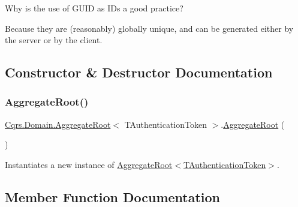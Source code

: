 Why is the use of G\+U\+ID as I\+Ds a good practice?

Because they are (reasonably) globally unique, and can be generated either by the server or by the client. 

\subsection{Constructor \& Destructor Documentation}
\mbox{\label{classCqrs_1_1Domain_1_1AggregateRoot_a1db2322dd7442e1e0c3c07332124eb2f_a1db2322dd7442e1e0c3c07332124eb2f}} 
\subsubsection{\texorpdfstring{Aggregate\+Root()}{AggregateRoot()}}
{\footnotesize\ttfamily \hyperlink{classCqrs_1_1Domain_1_1AggregateRoot}{Cqrs.\+Domain.\+Aggregate\+Root}$<$ T\+Authentication\+Token $>$.\hyperlink{classCqrs_1_1Domain_1_1AggregateRoot}{Aggregate\+Root} (\begin{DoxyParamCaption}{ }\end{DoxyParamCaption})\hspace{0.3cm}{\ttfamily [protected]}}



Instantiates a new instance of \hyperlink{classCqrs_1_1Domain_1_1AggregateRoot_a1db2322dd7442e1e0c3c07332124eb2f_a1db2322dd7442e1e0c3c07332124eb2f}{Aggregate\+Root$<$\+T\+Authentication\+Token$>$}. 



\subsection{Member Function Documentation}
\mbox{\label{classCqrs_1_1Domain_1_1AggregateRoot_a7e299b13c7556731e52670aa6d782296_a7e299b13c7556731e52670aa6d782296}} 
